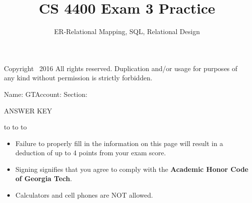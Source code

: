 \documentclass[10pt]{exam}
\title{CS 4400 Exam 3 Practice}
\date{ER-Relational Mapping, SQL, Relational Design}
\begin{document}
\maketitle
\thispagestyle{empty}
\firstpageheader{}               {\tiny Copyright \textcopyright\ 2016 All rights reserved. Duplication and/or usage for purposes of any kind without permission is strictly forbidden.}
                {}


\runningheader{}
{\small Name: \underline{\hspace{2.8in}} GTAccount: \underline{\hspace{1.4in}} Section: \underline{\hspace{.5in}}}
{}



\ifprintanswers
\begin{center}
{\LARGE ANSWER KEY}
\end{center}
\vspace{.25in}
\else
\vspace{0.1in}
\hbox to \textwidth{Name: \enspace\hrulefill}
\vspace{0.2in}
\hbox to 
\vspace{0.2in}
\hbox to \textwidth{Signature: \enspace\hrulefill}

\vfill

\begin{itemize}
\item Failure to properly fill in the information on this page will result in a deduction of up to 4 points from your exam score.
\item Signing signifies that you agree to comply with the {\bf Academic Honor Code of Georgia Tech}.
\item Calculators and cell phones are NOT allowed.
\end{itemize}

\fi


\end{document}
